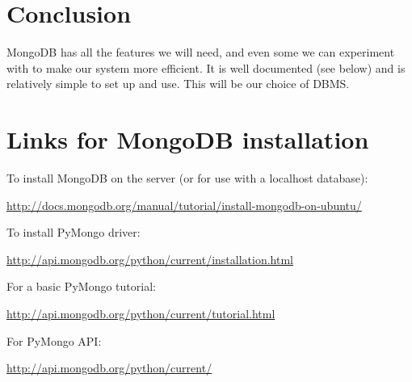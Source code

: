 \documentclass{article}
\begin{document}
\section{Conclusion}

MongoDB has all the features we will need, and even some we can experiment with to make our system more efficient. It is well documented (see below) and is relatively simple to set up and use. This will be our choice of DBMS.

\section{Links for MongoDB installation}

To install MongoDB on the server (or for use with a localhost database):

\noindent\url{http://docs.mongodb.org/manual/tutorial/install-mongodb-on-ubuntu/}

\noindent To install PyMongo driver:

\noindent\url{http://api.mongodb.org/python/current/installation.html}

\noindent For a basic PyMongo tutorial:

\noindent\url{http://api.mongodb.org/python/current/tutorial.html}

\noindent For PyMongo API:

\noindent\url{http://api.mongodb.org/python/current/}
\end{document}
